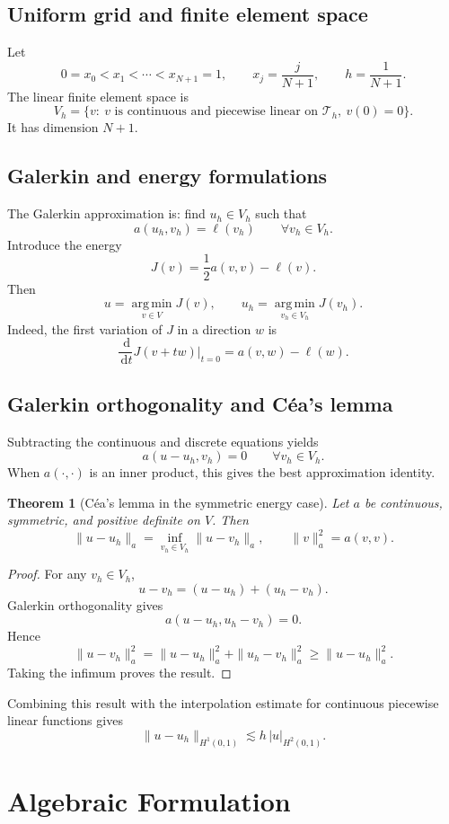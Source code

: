 \documentclass[11pt,a4paper]{article}
\newcommand{\dd}{\,\mathrm{d}}
\newcommand{\Th}{\mathcal{T}_h}
\newcommand{\Vh}{V_h}
\newcommand{\argmin}{\operatorname*{arg\,min}}
\theoremstyle{definition}
\theoremstyle{plain}
\newtheorem{theorem}{Theorem}[section]
\theoremstyle{remark}
\begin{document}
\subsection{Uniform grid and finite element space}
Let
\[
  0=x_0<x_1<\cdots<x_{N+1}=1,
  \qquad
  x_j=\frac{j}{N+1},
  \qquad
  h=\frac1{N+1}.
\]
The linear finite element space is
\[
  \Vh=\{v:\ v\text{ is continuous and piecewise linear on }\Th,\ v(0)=0\}.
\]
It has dimension $N+1$.

\subsection{Galerkin and energy formulations}
The Galerkin approximation is: find $u_h\in\Vh$ such that
\[
  a(u_h,v_h)=\ell(v_h)\qquad\forall v_h\in\Vh.
\]
Introduce the energy
\[
  J(v)=\frac12a(v,v)-\ell(v).
\]
Then
\[
  u=\argmin_{v\in V}J(v),
  \qquad
  u_h=\argmin_{v_h\in\Vh}J(v_h).
\]
Indeed, the first variation of $J$ in a direction $w$ is
\[
  \frac{\dd}{\dd t}J(v+tw)\bigg|_{t=0}=a(v,w)-\ell(w).
\]

\subsection{Galerkin orthogonality and C\'ea's lemma}
Subtracting the continuous and discrete equations yields
\[
  a(u-u_h,v_h)=0\qquad\forall v_h\in\Vh.
\]
When $a(\cdot,\cdot)$ is an inner product, this gives the best approximation identity.

\begin{theorem}[C\'ea's lemma in the symmetric energy case]
Let $a$ be continuous, symmetric, and positive definite on $V$. Then
\[
  \|u-u_h\|_a=\inf_{v_h\in\Vh}\|u-v_h\|_a,
  \qquad
  \|v\|_a^2=a(v,v).
\]
\end{theorem}

\begin{proof}
For any $v_h\in\Vh$,
\[
  u-v_h=(u-u_h)+(u_h-v_h).
\]
Galerkin orthogonality gives
\[
  a(u-u_h,u_h-v_h)=0.
\]
Hence
\[
  \|u-v_h\|_a^2
  =\|u-u_h\|_a^2+\|u_h-v_h\|_a^2
  \ge \|u-u_h\|_a^2.
\]
Taking the infimum proves the result.
\end{proof}

Combining this result with the interpolation estimate for continuous piecewise linear functions gives
\[
  \|u-u_h\|_{H^1(0,1)}\lesssim h\,|u|_{H^2(0,1)}.
\]

\section{Algebraic Formulation}
\end{document}
